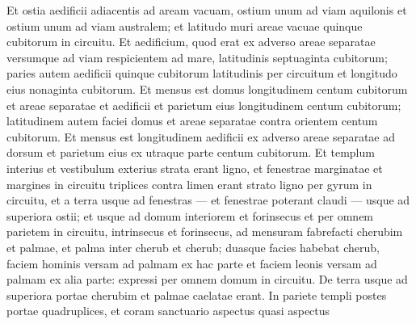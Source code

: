 \begin{biblechapter}
\begin{biblechapter}
\begin{biblechapter}
\begin{biblechapter}
\begin{biblechapter}
\begin{biblechapter}
\begin{biblechapter}
\begin{biblechapter}
\begin{biblechapter}
\begin{biblechapter}
\begin{biblechapter}
\begin{biblechapter}
\begin{biblechapter}
\begin{biblechapter}
\begin{biblechapter}
\begin{biblechapter}
\begin{biblechapter}
\begin{biblechapter}
\begin{biblechapter}
\begin{biblechapter}
\begin{biblechapter}
\begin{biblechapter}
\begin{biblechapter}
\begin{biblechapter}
\begin{biblechapter}
\begin{biblechapter}
\begin{biblechapter}
\begin{biblechapter}
\begin{biblechapter}
\begin{biblechapter}
\begin{biblechapter}
\begin{biblechapter}
\begin{biblechapter}
\begin{biblechapter}
\begin{biblechapter}
\begin{biblechapter}
\begin{biblechapter}
\begin{biblechapter}
\begin{biblechapter}
\begin{biblechapter}
\begin{biblechapter}
\verse Et ostia aedificii adiacentis ad aream vacuam, ostium unum ad viam aquilonis et ostium unum ad viam australem; et latitudo muri areae vacuae quinque cubitorum in circuitu.
 \verse Et aedificium, quod erat ex adverso areae separatae versumque ad viam respicientem ad mare, latitudinis septuaginta cubitorum; paries autem aedificii quinque cubitorum latitudinis per circuitum et longitudo eius nonaginta cubitorum. 
\verse Et mensus est domus longitudinem centum cubitorum et areae separatae et aedificii et parietum eius longitudinem centum cubitorum; 
\verse latitudinem autem faciei domus et areae separatae contra orientem centum cubitorum. 
\verse Et mensus est longitudinem aedificii ex adverso areae separatae ad dorsum et parietum eius ex utraque parte centum cubitorum. Et templum interius et vestibulum exterius 
\verse strata erant ligno, et fenestrae marginatae et margines in circuitu triplices contra limen erant strato ligno per gyrum in circuitu, et a terra usque ad fenestras — et fenestrae poterant claudi — usque ad superiora ostii; 
\verse et usque ad domum interiorem et forinsecus et per omnem parietem in circuitu, intrinsecus et forinsecus, ad mensuram 
\verse fabrefacti cherubim et palmae, et palma inter cherub et cherub; duasque facies habebat cherub, 
\verse faciem hominis versam ad palmam ex hac parte et faciem leonis versam ad palmam ex alia parte: expressi per omnem domum in circuitu. 
 \verse De terra usque ad superiora portae cherubim et palmae caelatae erant. In pariete templi 
\verse postes portae quadruplices, et coram sanctuario aspectus quasi aspectus 

\end{biblechapter}
\end{biblechapter}
\end{biblechapter}
\end{biblechapter}
\end{biblechapter}
\end{biblechapter}
\end{biblechapter}
\end{biblechapter}
\end{biblechapter}
\end{biblechapter}
\end{biblechapter}
\end{biblechapter}
\end{biblechapter}
\end{biblechapter}
\end{biblechapter}
\end{biblechapter}
\end{biblechapter}
\end{biblechapter}
\end{biblechapter}
\end{biblechapter}
\end{biblechapter}
\end{biblechapter}
\end{biblechapter}
\end{biblechapter}
\end{biblechapter}
\end{biblechapter}
\end{biblechapter}
\end{biblechapter}
\end{biblechapter}
\end{biblechapter}
\end{biblechapter}
\end{biblechapter}
\end{biblechapter}
\end{biblechapter}
\end{biblechapter}
\end{biblechapter}
\end{biblechapter}
\end{biblechapter}
\end{biblechapter}
\end{biblechapter}
\end{biblechapter}
